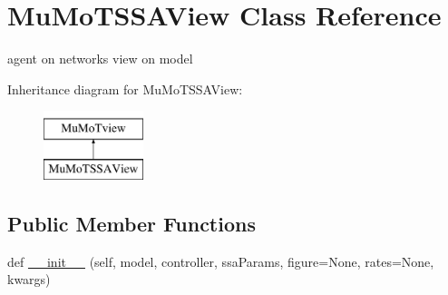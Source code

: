 \hypertarget{class_mu_mo_t_1_1_mu_mo_t_1_1_mu_mo_t_s_s_a_view}{}\section{Mu\+Mo\+T\+S\+S\+A\+View Class Reference}
\label{class_mu_mo_t_1_1_mu_mo_t_1_1_mu_mo_t_s_s_a_view}


agent on networks view on model  


Inheritance diagram for Mu\+Mo\+T\+S\+S\+A\+View\+:\begin{figure}[H]
\begin{center}
\leavevmode
\includegraphics[height=2.000000cm]{class_mu_mo_t_1_1_mu_mo_t_1_1_mu_mo_t_s_s_a_view}
\end{center}
\end{figure}
\subsection*{Public Member Functions}
\begin{DoxyCompactItemize}
\item 
def \hyperlink{class_mu_mo_t_1_1_mu_mo_t_1_1_mu_mo_t_s_s_a_view_ae0e9bcf60ca39799461bccf0e672c323}{\+\_\+\+\_\+init\+\_\+\+\_\+} (self, model, controller, ssa\+Params, figure=None, rates=None, kwargs)
\end{DoxyCompactItemize}
